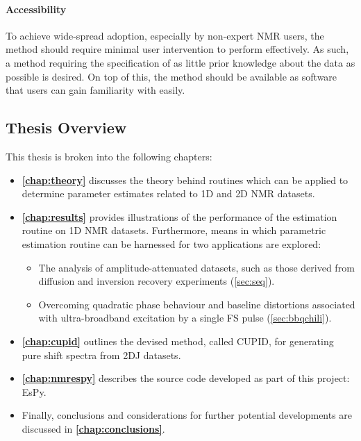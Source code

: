 \paragraph{Accessibility}
To achieve wide-spread adoption, especially by non-expert \ac{NMR} users,
the method should require minimal user intervention to perform effectively. As
such, a method requiring the specification of as little prior knowledge
about the data as possible is desired.
On top of this, the method should be available as software that users can gain
familiarity with easily.

\subsection{Thesis Overview}
This thesis is broken into the following chapters:
\begin{itemize}
    \item \textbf{\cref{chap:theory}} discusses the theory behind routines
        which can be applied to determine parameter estimates related to
        \ac{1D} and \ac{2D} \ac{NMR} datasets.
    \item \textbf{\cref{chap:results}} provides illustrations of the
        performance of the estimation routine on \ac{1D} \ac{NMR} datasets.
        Furthermore, means in which parametric estimation routine can be
        harnessed for two applications are explored:
        \begin{itemize}
            \item The analysis of amplitude-attenuated datasets, such as those
                derived from diffusion and inversion recovery experiments
                (\cref{sec:seq}).
            \item Overcoming quadratic phase behaviour and baseline distortions
                associated with ultra-broadband excitation by a single
                \acl{FS} pulse (\cref{sec:bbqchili}).
        \end{itemize}
    \item \textbf{\cref{chap:cupid}} outlines the devised method, called
        \ac{CUPID}, for generating pure shift spectra from \ac{2DJ} datasets.
    \item \textbf{\cref{chap:nmrespy}} describes the source code developed as
        part of this project: \ac{EsPy}.
    \item Finally, conclusions and considerations for further potential
        developments are discussed in \textbf{\cref{chap:conclusions}}.
\end{itemize}

